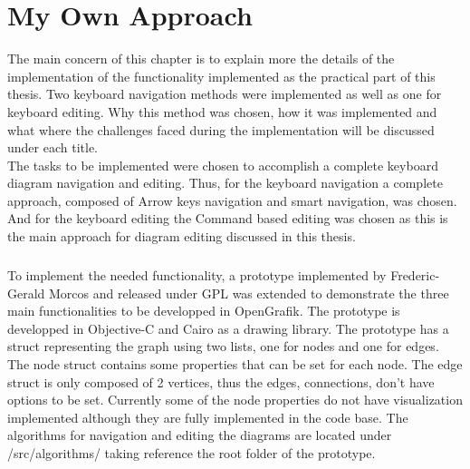 \chapter{My Own Approach}
\beginchapter

The main concern of this chapter is to explain more the details of the implementation of the functionality implemented as the practical part of this thesis. Two keyboard navigation methods were implemented as well as one for keyboard editing. Why this method was chosen, how it was implemented and what where the challenges faced during the implementation will be discussed under each title.\\
The tasks to be implemented were chosen to accomplish a complete keyboard diagram navigation and editing. Thus, for the keyboard navigation a complete approach, composed of Arrow keys navigation and smart navigation, was chosen. And for the keyboard editing the Command based editing was chosen as this is the main approach for diagram editing discussed in this thesis.

\paragraph{}
To implement the needed functionality, a prototype implemented by Frederic-Gerald Morcos and released under GPL was extended to demonstrate the three main functionalities to be developped in OpenGrafik. The prototype is developped in Objective-C and Cairo as a drawing library. The prototype has a struct representing the graph using two lists, one for nodes and one for edges. The node struct contains some properties that can be set for each node. The edge struct is only composed of 2 vertices, thus the edges, connections, don't have options to be set. Currently some of the node properties do not have visualization implemented although they are fully implemented in the code base. The algorithms for navigation and editing the diagrams are located under /src/algorithms/ taking reference the root folder of the prototype.

